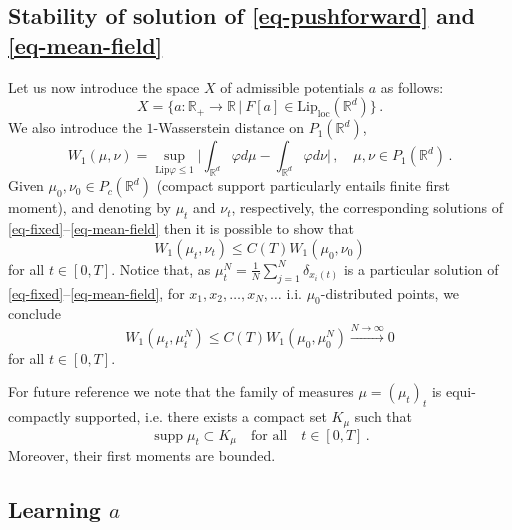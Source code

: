 \documentclass[A4paper,11pt]{article}
\theoremstyle{definition}
\newcommand{\Lip}{\text{Lip}}
\newcommand{\loc}{\text{loc}}
\newcommand{\R}{\mathbb{R}}
\DeclareMathOperator{\supp}{supp}
\begin{document}
\subsection{Stability of solution of \eqref{eq-pushforward} and \eqref{eq-mean-field}}

Let us now introduce the space $X$ of admissible potentials $a$ as follows:
\begin{equation}\label{eq-admissible}
	X=\bigl\{a:\R_+\rightarrow\R\,|\ F[a]\in\Lip_\loc(\R^d)\bigr \}\,.
\end{equation}
We also introduce the $1$-Wasserstein distance on $P_1(\R^d)$,
\begin{equation}\label{eq-wasserstein}
	W_1(\mu,\nu)=\sup_{\Lip\varphi\leq 1}\biggl|\int_{\R^d}\varphi d\mu-\int_{\R^d}\varphi d\nu\biggr | \,,
	\quad\mu,\nu\in P_1(\R^d)\,.
\end{equation}
Given $\mu_0,\nu_0\in P_c(\R^d)$ (compact support particularly entails finite first moment), and denoting by $\mu_t$ and $\nu_t$, respectively, the corresponding solutions of \eqref{eq-fixed}--\eqref{eq-mean-field} then it is possible to show that
\begin{equation}
	W_1(\mu_t,\nu_t)\leq C(T)W_1(\mu_0,\nu_0)
\end{equation}
for all $t\in [0,T]$. Notice that, as $\mu_t^N=\frac{1}{N}\sum_{j=1}^N\delta_{x_i(t)}$ is a particular solution of \eqref{eq-fixed}--\eqref{eq-mean-field}, for $x_1,x_2,\ldots,x_N,\ldots$ i.i. $\mu_0$-distributed points, we  conclude
\begin{equation}\label{eq-wasserstein-discret}
	W_1(\mu_t,\mu_t^N)\leq C(T)W_1(\mu_0,\mu_0^N)\stackrel{N\rightarrow\infty}{\longrightarrow}0
\end{equation}
for all $t\in [0,T]$.

For future reference we note that the family of measures $\mu=(\mu_t)_t$ is equi-compactly supported, i.e. there exists a compact set $K_\mu$ such that
\begin{equation}\label{eq-equi-compact}
	\supp\mu_t\subset K_\mu\quad\text{for all}\quad t\in [0,T]\,.
\end{equation}
Moreover, their first moments are bounded.

\subsection{Learning $a$}
\end{document}
